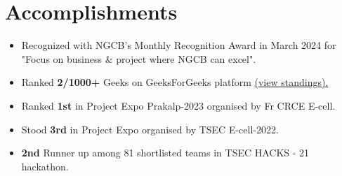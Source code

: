 \documentclass[a4,10pt]{article}
\newenvironment{zitemize}{
\begin{itemize}\itemsep0pt \parskip0pt \parsep1pt}
{\end{itemize}\vspace{-0.5cm}}
\begin{document}
\section{Accomplishments}
\begin{zitemize}
    \item Recognized with NGCB's Monthly Recognition Award in March 2024 for "Focus on business \& project where NGCB can excel".
    \item Ranked \textbf{2/1000+} Geeks on GeeksForGeeks platform \href{https://auth.geeksforgeeks.org/college/thadomal-shahani-engineering-college-tsec-mumbai/}{({view standings}).}
    \item Ranked \textbf{1st} in Project Expo Prakalp-2023 organised by Fr CRCE E-cell.
    \item Stood \textbf{3rd} in Project Expo organised by TSEC E-cell-2022.
    \item \textbf{2nd} Runner up among 81 shortlisted teams in TSEC HACKS - 21 hackathon. 
    \end{zitemize}

\end{document}
